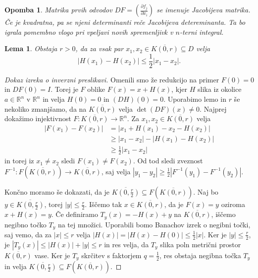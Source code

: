 \documentclass[10pt, a4paper]{article}
\newtheorem*{opomba}{Opomba}
\newtheorem{lema}[izr]{Lema}
\newenvironment{noticeC}{%
  \tcolorbox[%
  notitle,
  empty,
  enhanced,  %
  breakable,
  coltext=black, 
  fontupper=\rmfamily,
  parbox=false,
  noparskip,
  sharp corners,
  boxrule=-1pt,  %
  frame hidden,
  left=7pt,  %
  right=7pt,
  top=5pt,
  bottom=5pt,
  before skip=2.5ex plus 2pt,
  after skip=2.5ex plus 2pt,
  overlay unbroken and last={%
  },
  ]}
{\endtcolorbox}
\newenvironment{dokaz}%
  {\begin{noticeC}\begin{proof}}%
  {\end{proof}\end{noticeC}}
\newcommand{\R}{\mathbb {R}}
\begin{document}
\begin{opomba}
    Matrika prvih odvodov $DF = \left(\frac{\partial f_j}{\partial x_i}\right)$ se imenuje Jacobijeva matrika.
    Če je kvadratna, pa se njeni determinanti reče Jacobijeva detereminanta.
    Ta bo igrala pomembno vlogo pri vpeljavi novih spremenljivk v $n$-terni integral.
\end{opomba}

\begin{lema}
    Obstaja $r > 0$, da za vsak par $x_1, x_2 \in \overline{K(0, r)} \subseteq D$ velja 
    $$|H(x_1) - H(x_2)| \leq \frac{1}{2} |x_1 - x_2|.$$
\end{lema}

\begin{dokaz}[Dokaz izreka o inverzni preslikavi]
    Omenili smo že redukcijo na primer $F(0) = 0$ in $DF(0) = I$.
    Torej je $F$ oblike $F(x) = x + H(x)$, kjer $H$ slika iz okolice $a \in \R^n$ v $\R^n$
    in velja $H(0) = 0$ in $(DH)(0) = 0$.
    Uporabimo lemo in $r$ še nekoliko zmanjšamo, da na $\overline{K(0, r)}$ velja $\det (DF) (x) \neq 0$.
    Najprej dokažimo injektivnost $F: \overline{K(0, r)} \to \R^n$. Za $x_1, x_2 \in \overline{K(0, r)}$ velja 
    \begin{align*}
        |F(x_1) - F(x_2)| &= |x_1 + H(x_1) - x_2 - H(x_2)|\\
        &\geq |x_1 - x_2| - |H(x_1) - H(x_2)|\\
        &\geq \frac{1}{2} |x_1 - x_2|
    \end{align*}
    in torej iz $x_1 \neq x_2$ sledi $F(x_1) \neq F(x_2)$.
    Od tod sledi zveznost $F^{-1}: F(\overline{K(0, r)}) \to \overline{K(0, r)}$,
    saj velja $|y_1 - y_2| \geq \frac{1}{2} |F^{-1} (y_1) - F^{-1} (y_2)|$.

    Končno moramo še dokazati, da je $\overline{K \left(0, \frac{r}{2}\right)} \subseteq F(\overline{K(0, r)})$.
    Naj bo $y \in \overline{K \left(0, \frac{r}{2}\right)}$, torej $|y| \leq \frac{r}{2}$.
    Iščemo tak $x \in \overline{K \left(0, r\right)}$, da je $F(x) = y$ oziroma $x + H(x) = y$.
    Če definiramo $T_y (x) = - H(x) + y$ na $\overline{K(0, r)}$, iščemo negibno točko $T_y$
    na tej množici. Uporabili bomo Banachov izrek o negibni točki, saj vemo, da za 
    $|x| \leq r$ velja $|H(x)| = |H(x) - H(0)| \leq \frac{1}{2} |x|$.
    Ker je $|y| \leq \frac{r}{2}$, je $|T_y (x)| \leq |H(x)| + |y| \leq r$ in res velja, 
    da $T_y$ slika poln metrični prostor $\overline{K(0, r)}$ vase.
    Ker je $T_y$ skrčitev s faktorjem $q = \frac{1}{2}$, res obstaja negibna točka $T_y$ in velja 
    $\overline{K \left(0, \frac{r}{2}\right)} \subseteq F(\overline{K(0, r)})$.


\end{dokaz}
\end{document}
